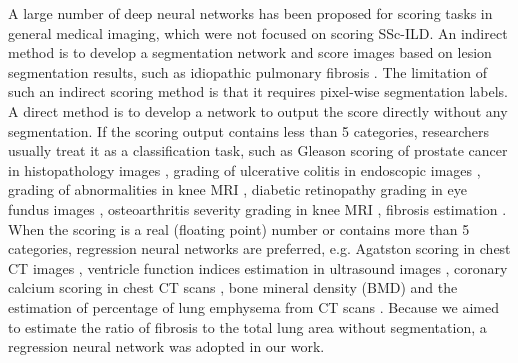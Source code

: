 A large number of deep neural networks has been proposed for scoring tasks in general medical imaging, which were not focused on scoring SSc-ILD. An indirect method is to develop a segmentation network and score images based on lesion segmentation results, such as idiopathic pulmonary fibrosis \cite{nam2023prognostic}. The limitation of such an indirect scoring method is that it requires pixel-wise segmentation labels. A direct method is to develop a network to output the score directly without any segmentation. If the scoring output contains less than 5 categories, researchers usually treat it as a classification task, such as Gleason scoring of prostate cancer in histopathology images \cite{nagpal2019development, linkon2021deep, bulten2020automated}, grading of ulcerative colitis in endoscopic images \cite{stidham2019performance}, grading of abnormalities in knee MRI \cite{astuto2021automatic}, diabetic retinopathy grading in eye fundus images \cite{araujo2020dr}, osteoarthritis severity grading in knee MRI \cite{chen2019fully}, fibrosis estimation \cite{Walsh2022}. When the scoring is a real (floating point) number or contains more than 5 categories, regression neural networks are preferred, e.g. Agatston scoring in chest CT images \cite{cano2018automated}, ventricle function indices estimation in ultrasound images \cite{luo2020commensal}, coronary calcium scoring in chest CT scans \cite{de2019direct, mu2022calcium}, bone mineral density (BMD) and the estimation of percentage of lung emphysema from CT scans \cite{gonzalez2018deep}. Because we aimed to estimate the ratio of fibrosis to the total lung area without segmentation, a regression neural network was adopted in our work.



